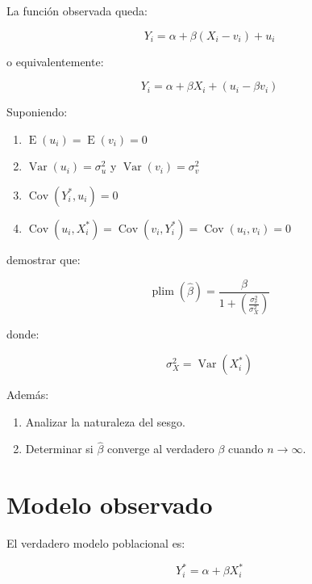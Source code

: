 \documentclass[12pt,letterpaper]{article}
\newcommand{\Var}{\operatorname{Var}}
\newcommand{\Cov}{\operatorname{Cov}}
\newcommand{\E}{\operatorname{E}}
\newcommand{\plim}{\operatorname{plim}}
\begin{document}
La función observada queda:

\begin{equation}
Y_i=\alpha+\beta(X_i-v_i)+u_i
\end{equation}

o equivalentemente:

\begin{equation}
Y_i=\alpha+\beta X_i+(u_i-\beta v_i)
\end{equation}

Suponiendo:

\begin{enumerate}[leftmargin=1.8em]
\item $\E(u_i)=\E(v_i)=0$
\item $\Var(u_i)=\sigma_u^2$ y $\Var(v_i)=\sigma_v^2$
\item $\Cov(Y_i^{*},u_i)=0$
\item $\Cov(u_i,X_i^{*})
      =
      \Cov(v_i,Y_i^{*})
      =
      \Cov(u_i,v_i)=0$
\end{enumerate}

demostrar que:

\begin{equation}
\plim(\hat{\beta})
=
\frac{\beta}
{1+\left(\frac{\sigma_v^2}{\sigma_X^2}\right)}
\end{equation}

donde:

\begin{equation}
\sigma_X^2=\Var(X_i^{*})
\end{equation}

Además:

\begin{enumerate}[leftmargin=1.8em]
\item[a)] Analizar la naturaleza del sesgo.
\item[b)] Determinar si $\hat{\beta}$ converge al verdadero $\beta$
cuando $n\to\infty$.
\end{enumerate}

\section{Modelo observado}

El verdadero modelo poblacional es:

\begin{equation}
Y_i^{*}=\alpha+\beta X_i^{*}
\end{equation}
\end{document}
